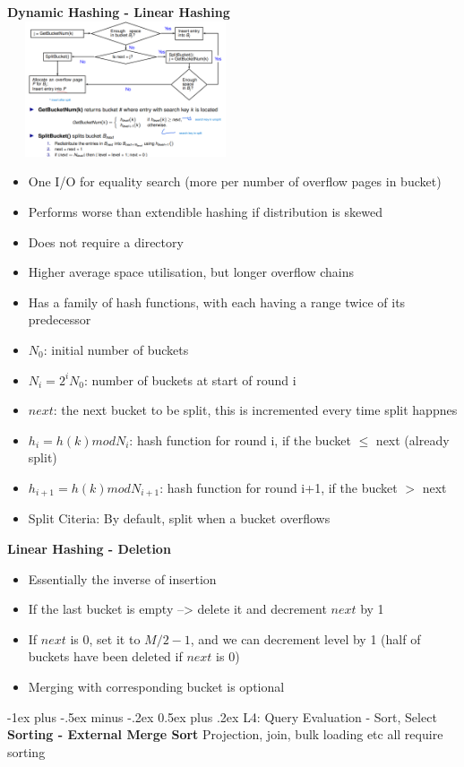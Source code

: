 \documentclass[10pt, landscape]{article}
\makeatletter
\renewcommand{\section}{\@startsection{section}{1}{0mm}%
                                {-1ex plus -.5ex minus -.2ex}%
                                {0.5ex plus .2ex}%
                                {\normalfont\large\bfseries}}
\makeatother
\begin{document}
\begin{multicols}{4}
\textbf{Dynamic Hashing - Linear Hashing}
\includegraphics[width=7cm, height=4cm]{linear_hash.png}  
\begin{itemize}
  \item One I/O for equality search (more per number of overflow pages in bucket)
  \item Performs worse than extendible hashing if distribution is skewed
  \item Does not require a directory
  \item Higher average space utilisation, but longer overflow chains
  \item Has a family of hash functions, with each having a range twice of its predecessor
  \item $N_0$: initial number of buckets
  \item $N_i = 2^i N_0$: number of buckets at start of round i
  \item $next$: the next bucket to be split, this is incremented every time split happnes
  \item $h_i=h(k) mod N_{i}$: hash function for round i, if the bucket $\leq$ next (already split)
  \item $h_{i+1}=h(k) mod N_{i+1}$: hash function for round i+1, if the bucket $>$ next
  \item Split Citeria: By default, split when a bucket overflows
\end{itemize}

\textbf{Linear Hashing - Deletion}
\begin{itemize}
  \item Essentially the inverse of insertion
  \item If the last bucket is empty --> delete it and decrement $next$ by 1
  \item If $next$ is 0, set it to $M/2 - 1$, and we can decrement level by 1 (half of buckets have been deleted if $next$ is 0)
  \item Merging with corresponding bucket is optional
\end{itemize}

\section{L4: Query Evaluation - Sort, Select}
\textbf{Sorting - External Merge Sort}
\newline
Projection, join, bulk loading etc all require sorting


\end{multicols}
\end{document}
